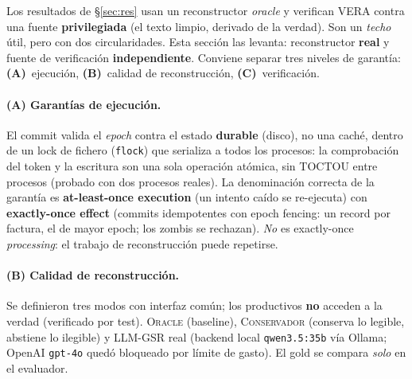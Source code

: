 Los resultados de §\ref{sec:res} usan un reconstructor \emph{oracle} y verifican VERA contra
una fuente \textbf{privilegiada} (el texto limpio, derivado de la verdad). Son un \emph{techo}
útil, pero con dos circularidades. Esta sección las levanta: reconstructor \textbf{real} y
fuente de verificación \textbf{independiente}. Conviene separar tres niveles de garantía:
\textbf{(A)}~ejecución, \textbf{(B)}~calidad de reconstrucción, \textbf{(C)}~verificación.

\paragraph{(A) Garantías de ejecución.} El commit valida el \emph{epoch} contra el estado
\textbf{durable} (disco), no una caché, dentro de un lock de fichero (\texttt{flock}) que
serializa a todos los procesos: la comprobación del token y la escritura son una sola
operación atómica, sin TOCTOU entre procesos (probado con dos procesos reales). La
denominación correcta de la garantía es \textbf{at-least-once execution} (un intento caído se
re-ejecuta) con \textbf{exactly-once effect} (commits idempotentes con epoch fencing: un record
por factura, el de mayor epoch; los zombis se rechazan). \emph{No} es exactly-once
\emph{processing}: el trabajo de reconstrucción puede repetirse.

\paragraph{(B) Calidad de reconstrucción.} Se definieron tres modos con interfaz común; los
productivos \textbf{no} acceden a la verdad (verificado por test). \textsc{Oracle} (baseline),
\textsc{Conservador} (conserva lo legible, abstiene lo ilegible) y \textsc{LLM-GSR} real
(backend local \texttt{qwen3.5:35b} vía Ollama; OpenAI \texttt{gpt-4o} quedó bloqueado por
límite de gasto). El gold se compara \emph{solo} en el evaluador.


